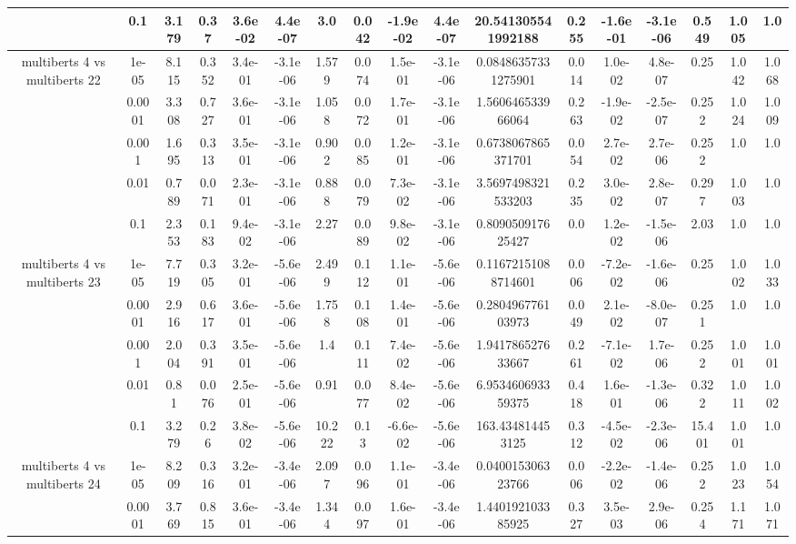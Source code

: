 \begin{tabular}{|c|c|c|c|c|c|c|c|c|c|c|c|c|c|c|c|c|}
 & 0.1 & 3.179 & 0.37 & 3.6e-02 & 4.4e-07 & 3.0 & 0.042 & -1.9e-02 & 4.4e-07 & 20.541305541992188 & 0.255 & -1.6e-01 & -3.1e-06 & 0.549 & 1.005 & 1.0 \\
\hline
\multirow{5}{*}{multiberts 4 vs multiberts 22} & 1e-05 & 8.115 & 0.352 & 3.4e-01 & -3.1e-06 & 1.579 & 0.074 & 1.5e-01 & -3.1e-06 & 0.08486357331275901 & 0.014 & 1.0e-02 & 4.8e-07 & 0.25 & 1.042 & 1.068 \\
 & 0.0001 & 3.308 & 0.727 & 3.6e-01 & -3.1e-06 & 1.058 & 0.072 & 1.7e-01 & -3.1e-06 & 1.560646533966064 & 0.263 & -1.9e-02 & -2.5e-07 & 0.252 & 1.024 & 1.009 \\
 & 0.001 & 1.695 & 0.313 & 3.5e-01 & -3.1e-06 & 0.902 & 0.085 & 1.2e-01 & -3.1e-06 & 0.6738067865371701 & 0.054 & 2.7e-02 & 2.7e-06 & 0.252 & 1.0 & 1.0 \\
 & 0.01 & 0.789 & 0.071 & 2.3e-01 & -3.1e-06 & 0.888 & 0.079 & 7.3e-02 & -3.1e-06 & 3.5697498321533203 & 0.235 & 3.0e-02 & 2.8e-07 & 0.297 & 1.003 & 1.0 \\
 & 0.1 & 2.353 & 0.183 & 9.4e-02 & -3.1e-06 & 2.27 & 0.089 & 9.8e-02 & -3.1e-06 & 0.809050917625427 & 0.0 & 1.2e-02 & -1.5e-06 & 2.03 & 1.0 & 1.0 \\
\hline
\multirow{5}{*}{multiberts 4 vs multiberts 23} & 1e-05 & 7.719 & 0.305 & 3.2e-01 & -5.6e-06 & 2.499 & 0.112 & 1.1e-01 & -5.6e-06 & 0.11672151088714601 & 0.006 & -7.2e-02 & -1.6e-06 & 0.25 & 1.002 & 1.033 \\
 & 0.0001 & 2.916 & 0.617 & 3.6e-01 & -5.6e-06 & 1.758 & 0.108 & 1.4e-01 & -5.6e-06 & 0.280496776103973 & 0.049 & 2.1e-02 & -8.0e-07 & 0.251 & 1.0 & 1.0 \\
 & 0.001 & 2.004 & 0.391 & 3.5e-01 & -5.6e-06 & 1.4 & 0.111 & 7.4e-02 & -5.6e-06 & 1.941786527633667 & 0.261 & -7.1e-02 & 1.7e-06 & 0.252 & 1.001 & 1.001 \\
 & 0.01 & 0.81 & 0.076 & 2.5e-01 & -5.6e-06 & 0.91 & 0.077 & 8.4e-02 & -5.6e-06 & 6.953460693359375 & 0.418 & 1.6e-01 & -1.3e-06 & 0.322 & 1.011 & 1.002 \\
 & 0.1 & 3.279 & 0.26 & 3.8e-02 & -5.6e-06 & 10.222 & 0.13 & -6.6e-02 & -5.6e-06 & 163.434814453125 & 0.312 & -4.5e-02 & -2.3e-06 & 15.401 & 1.001 & 1.0 \\
\hline
\multirow{5}{*}{multiberts 4 vs multiberts 24} & 1e-05 & 8.209 & 0.316 & 3.2e-01 & -3.4e-06 & 2.097 & 0.096 & 1.1e-01 & -3.4e-06 & 0.040015306323766 & 0.006 & -2.2e-02 & -1.4e-06 & 0.252 & 1.023 & 1.054 \\
 & 0.0001 & 3.769 & 0.815 & 3.6e-01 & -3.4e-06 & 1.344 & 0.097 & 1.6e-01 & -3.4e-06 & 1.440192103385925 & 0.327 & 3.5e-03 & 2.9e-06 & 0.254 & 1.171 & 1.071 \\

\end{tabular}
